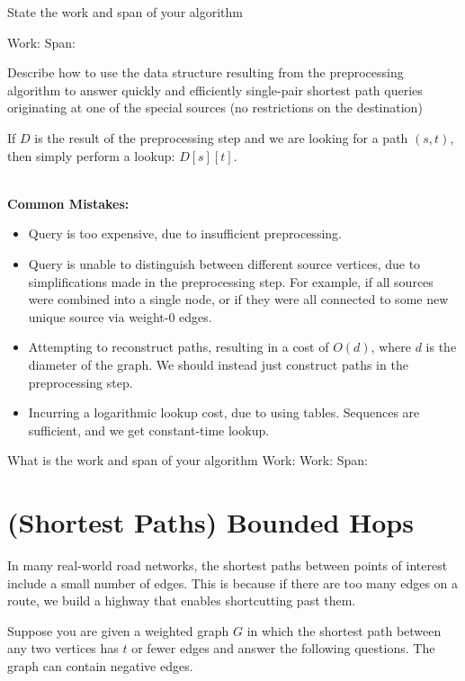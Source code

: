\begin{problem}
\ask[4]
State the work and span of your algorithm

\solfin 
Work: 
Span: 

\ask[5]
Describe how to use the data structure resulting from the
preprocessing algorithm to answer quickly and efficiently single-pair
shortest path queries originating at one of the special sources (no
restrictions on the destination)

\sol
If $D$ is the result of the preprocessing step and we are looking for a path
$(s, t)$, then simply perform a lookup: $D[s][t]$.
~~~~~~~~~~~~~~~~~~~~~~~~~~~~~~~~~~~~~~~~~~~~~~~~~

\notes
\textbf{Common Mistakes:}
\begin{itemize}
	\item Query is too expensive, due to insufficient preprocessing.
	\item Query is unable to distinguish between different source vertices, due
  to simplifications made in the preprocessing step. For example, if all
  sources were combined into a single node, or if they were all connected to
  some new unique source via weight-0 edges.
	\item Attempting to reconstruct paths, resulting in a cost of $O(d)$, where
  $d$ is the diameter of the graph. We should instead just construct paths in
  the preprocessing step.
	\item Incurring a logarithmic lookup cost, due to using tables. Sequences are
  sufficient, and we get constant-time lookup.
\end{itemize}


\ask What is the work and span of your algorithm Work: 
\solfin 
Work:   
Span:  


\end{problem}





\section{(Shortest Paths) Bounded Hops}

In many real-world road networks, the shortest paths between points of
interest include a small number of edges.  This is because if there
are too many edges on a route, we build a highway that enables
shortcutting past them.  

Suppose you are given a weighted graph $G$ in which the shortest path
between any two vertices has $t$ or fewer edges and answer the
following questions.  The graph can contain negative edges.

